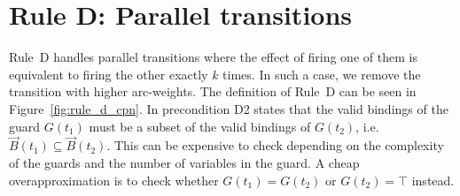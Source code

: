 \section*{Rule D: Parallel transitions}\label{sec:rule_d_cpn}
Rule~D handles parallel transitions where the effect of firing one of them is equivalent to firing the other exactly $k$ times.
In such a case, we remove the transition with higher arc-weights.
The definition of Rule~D can be seen in Figure~\ref{fig:rule_d_cpn}.
In precondition D2 states that the valid bindings of the guard $G(t_1)$ must be a subset of the valid bindings of $G(t_2)$,
i.e.\ $\vec B(t_1)\subseteq\vec B(t_2)$.
This can be expensive to check depending on the complexity of the guards and the number of variables in the guard.
A cheap overapproximation is to check whether $G(t_1)=G(t_2)$ or $G(t_2)=\top$ instead.

